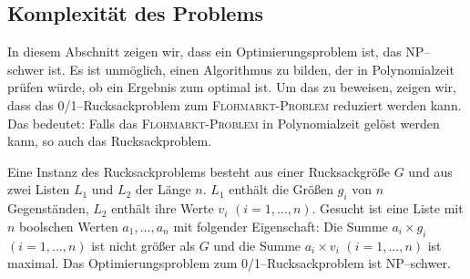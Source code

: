 \subsection{Komplexität des Problems}\label{sec:komplexitaet}



In diesem Abschnitt zeigen wir, dass \fp{} ein Optimierungsproblem ist, das NP--schwer ist.
Es ist unmöglich, einen Algorithmus zu bilden, der in Polynomialzeit prüfen würde,
ob ein Ergebnis zum \fp{} optimal ist. 
Um das zu beweisen, zeigen wir, dass das
0/1--Rucksackproblem zum \textsc{Floh\-markt-\-Pro\-blem} reduziert werden kann.
Das bedeutet: Falls das \textsc{Floh\-markt-\-Pro\-blem} in Polynomialzeit gelöst werden kann,
so auch das Rucksackproblem.

Eine Instanz des Rucksackproblems besteht aus einer Rucksackgröße $G$ und aus zwei Listen 
$L_1$ und $L_2$ der Länge $n$. $L_1$ enthält die Größen $g_i$ von $n$ Gegenständen,
$L_2$ enthält ihre Werte $v_i$ $(i=1,...,n)$.
Gesucht ist eine Liste mit $n$ boolschen Werten $a_1, ..., a_n$ mit folgender Eigenschaft:
Die Summe $a_i \times g_i$ $(i=1,...,n)$ ist nicht größer als $G$ und die Summe
$a_i \times v_i$ $(i=1,...,n)$ ist maximal.
Das Optimierungsproblem zum 0/1--Rucksackproblem ist NP--schwer.\cite{garey_johnson_2009}



